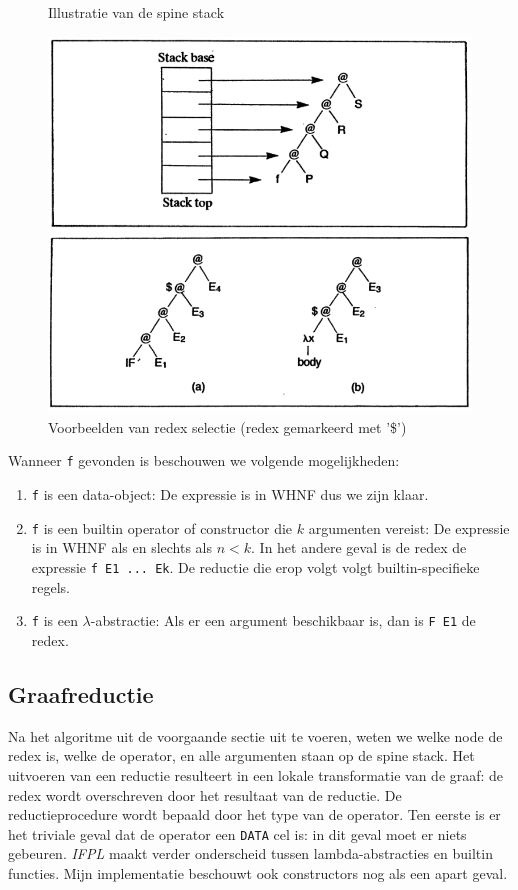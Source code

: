 \documentclass[a4paper,10pt]{article}
\begin{document}
\begin{figure}[h]
  \caption{Illustratie van de spine stack}
  \includegraphics[width=\linewidth]{images/slpj203}
  \caption{Voorbeelden van redex selectie (redex gemarkeerd met '\$')}
  \includegraphics[width=\linewidth]{images/slpj202}
\end{figure}

Wanneer \texttt{f} gevonden is beschouwen we volgende mogelijkheden:
\begin{enumerate}
\item \texttt{f} is een data-object: De expressie is in WHNF dus we zijn klaar.
\item \texttt{f} is een builtin operator of constructor die $k$ argumenten vereist: De expressie is in WHNF als en slechts als $n < k$. In het andere geval is de redex de expressie \texttt{f E1 ... Ek}. De reductie die erop volgt volgt builtin-specifieke regels.
\item \texttt{f} is een $\lambda$-abstractie: Als er een argument beschikbaar is, dan is \texttt{F E1} de redex.
\end{enumerate}
\paragraph{}

\subsection{Graafreductie}
Na het algoritme uit de voorgaande sectie uit te voeren, weten we welke node de redex is, welke de operator, en alle argumenten staan op de spine stack.
Het uitvoeren van een reductie resulteert in een lokale transformatie van de graaf: de redex wordt overschreven door het resultaat van de reductie.
De reductieprocedure wordt bepaald door het type van de operator.
Ten eerste is er het triviale geval dat de operator een \texttt{DATA} cel is: in dit geval moet er niets gebeuren.
\emph{IFPL} maakt verder onderscheid tussen lambda-abstracties en builtin functies. Mijn implementatie beschouwt ook constructors nog als een apart geval.
\end{document}
